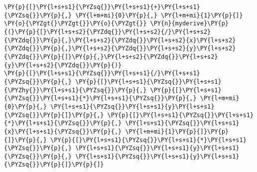 \begin{Verbatim}[commandchars=\\\{\}]
\PY{p}{[}\PY{l+s+s1}{\PYZsq{}}\PY{l+s+s1}{+}\PY{l+s+s1}{\PYZsq{}}\PY{p}{,} \PY{l+m+mi}{0}\PY{p}{,} \PY{l+m+mi}{1}\PY{p}{]}
\PY{o}{\PYZgt{}\PYZgt{}}\PY{o}{\PYZgt{}} \PY{n}{myderive}\PY{p}{(}\PY{p}{[}\PY{l+s+s2}{\PYZdq{}}\PY{l+s+s2}{/}\PY{l+s+s2}{\PYZdq{}}\PY{p}{,}\PY{l+s+s2}{\PYZdq{}}\PY{l+s+s2}{x}\PY{l+s+s2}{\PYZdq{}}\PY{p}{,}\PY{l+s+s2}{\PYZdq{}}\PY{l+s+s2}{y}\PY{l+s+s2}{\PYZdq{}}\PY{p}{]}\PY{p}{,}\PY{l+s+s2}{\PYZdq{}}\PY{l+s+s2}{y}\PY{l+s+s2}{\PYZdq{}}\PY{p}{)}
\PY{p}{[}\PY{l+s+s1}{\PYZsq{}}\PY{l+s+s1}{/}\PY{l+s+s1}{\PYZsq{}}\PY{p}{,} \PY{p}{[}\PY{l+s+s1}{\PYZsq{}}\PY{l+s+s1}{\PYZhy{}}\PY{l+s+s1}{\PYZsq{}}\PY{p}{,} \PY{p}{[}\PY{l+s+s1}{\PYZsq{}}\PY{l+s+s1}{*}\PY{l+s+s1}{\PYZsq{}}\PY{p}{,} \PY{l+m+mi}{0}\PY{p}{,} \PY{l+s+s1}{\PYZsq{}}\PY{l+s+s1}{y}\PY{l+s+s1}{\PYZsq{}}\PY{p}{]}\PY{p}{,} \PY{p}{[}\PY{l+s+s1}{\PYZsq{}}\PY{l+s+s1}{*}\PY{l+s+s1}{\PYZsq{}}\PY{p}{,} \PY{l+s+s1}{\PYZsq{}}\PY{l+s+s1}{x}\PY{l+s+s1}{\PYZsq{}}\PY{p}{,} \PY{l+m+mi}{1}\PY{p}{]}\PY{p}{]}\PY{p}{,} \PY{p}{[}\PY{l+s+s1}{\PYZsq{}}\PY{l+s+s1}{*}\PY{l+s+s1}{\PYZsq{}}\PY{p}{,} \PY{l+s+s1}{\PYZsq{}}\PY{l+s+s1}{y}\PY{l+s+s1}{\PYZsq{}}\PY{p}{,} \PY{l+s+s1}{\PYZsq{}}\PY{l+s+s1}{y}\PY{l+s+s1}{\PYZsq{}}\PY{p}{]}\PY{p}{]}
\end{Verbatim}
